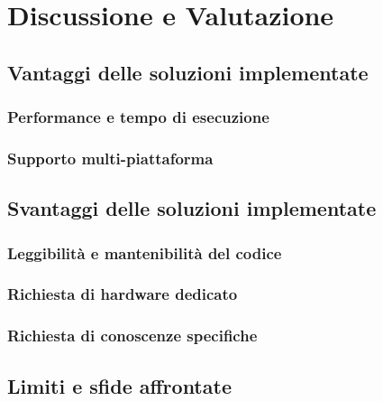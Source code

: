 \chapter{Discussione e Valutazione}
\label{ch:discussione}

\section{Vantaggi delle soluzioni implementate}
\label{sec:vantaggi}

\lipsum[1]

\subsection{Performance e tempo di esecuzione}
\label{subsec:performance}

\lipsum[1]

\subsection{Supporto multi-piattaforma}
\label{subsec:supporto}

\lipsum[1]

\section{Svantaggi delle soluzioni implementate}
\label{sec:svantaggi}

\lipsum[1]

\subsection{Leggibilità e mantenibilità del codice}
\label{subsec:leggibilita}

\lipsum[1]

\subsection{Richiesta di hardware dedicato}
\label{subsec:hardware}

\lipsum[1]

\subsection{Richiesta di conoscenze specifiche}
\label{subsec:conoscenze}

\lipsum[1]

\section{Limiti e sfide affrontate}
\label{sec:limiti}

\lipsum[1]
